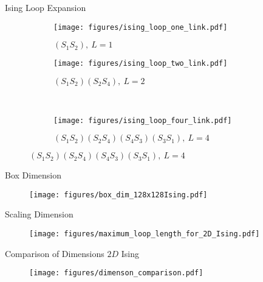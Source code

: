 \documentclass[10pt]{beamer}
\begin{document}
\begin{frame}{Ising Loop Expansion}
\begin{figure}[h!]
    \begin{subfigure}{.4\linewidth}
        \centering
        \texttt{[image: figures/ising\_loop\_one\_link.pdf]}
        \caption{$(S_1 S_2), \ L = 1$}
    \end{subfigure}%
    \begin{subfigure}{.4\linewidth}
        \centering
        \texttt{[image: figures/ising\_loop\_two\_link.pdf]}
        \caption{$(S_1 S_2)(S_2 S_4), \ L = 2$}
    \end{subfigure}\\[1ex]
    \begin{subfigure}{.8\linewidth}
        \centering
        \texttt{[image: figures/ising\_loop\_four\_link.pdf]}
        \caption{$(S_1 S_2)(S_2 S_4)(S_4 S_3)(S_3 S_1), \ L = 4$}
    \end{subfigure}
\end{figure}
\end{frame}


\begin{frame}{Box Dimension}
    \begin{figure}[h!]
        \centering
            \texttt{[image: figures/box\_dim\_128x128Ising.pdf]}
    \end{figure}
\end{frame}

\begin{frame}{Scaling Dimension}
    \begin{figure}[h!]
        \centering
            \texttt{[image: figures/maximum\_loop\_length\_for\_2D\_Ising.pdf]}
    \end{figure}
\end{frame}

\begin{frame}{Comparison of Dimensions $2D$ Ising}
    \begin{figure}[h!]
        \centering
            \texttt{[image: figures/dimenson\_comparison.pdf]}
    \end{figure}
\end{frame}
\end{document}
